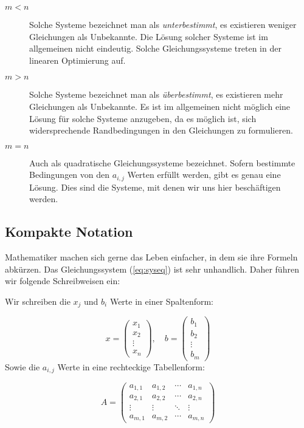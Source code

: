 \begin{description}
\item[$m<n$] Solche Systeme bezeichnet man als \emph{unterbestimmt}, es existieren weniger Gleichungen als Unbekannte. Die Lösung solcher Systeme ist im allgemeinen nicht eindeutig. Solche Gleichungssysteme treten in der linearen Optimierung auf. 
\item[$m>n$] Solche Systeme bezeichnet man als \emph{überbestimmt}, es existieren mehr Gleichungen als Unbekannte. Es ist im allgemeinen nicht möglich eine Lösung für solche Systeme anzugeben, da es möglich ist, sich widersprechende Randbedingungen in den Gleichungen zu formulieren. 
\item[$m=n$] Auch als quadratische Gleichungssysteme bezeichnet. Sofern bestimmte Bedingungen von den $a_{i,j}$ Werten erfüllt werden, gibt es genau eine Lösung. Dies sind die Systeme, mit denen wir uns hier beschäftigen werden.
\end{description}

\subsection{Kompakte Notation}

Mathematiker machen sich gerne das Leben einfacher, in dem sie ihre Formeln abkürzen. Das Gleichungssystem (\ref{eq:syseq}) ist sehr unhandlich. Daher führen wir folgende Schreibweisen ein:

Wir schreiben die $x_j$ und $b_i$ Werte in einer Spaltenform: 

\[
x = \begin{pmatrix}
x_1 \\
x_2 \\
\vdots \\
x_n
\end{pmatrix}, \quad b = \begin{pmatrix}
b_1 \\
b_2 \\
\vdots \\
b_m
\end{pmatrix}
\]
Sowie die $a_{i,j}$ Werte in eine rechteckige Tabellenform:

\[
A = \begin{pmatrix}
a_{1,1} & a_{1,2} & \cdots & a_{1,n} \\
a_{2,1} & a_{2,2} & \cdots & a_{2,n} \\
\vdots & \vdots & \ddots & \vdots \\
a_{m,1} & a_{m,2} & \cdots & a_{m,n}
\end{pmatrix}
\]

